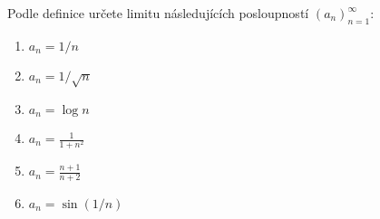 Podle definice určete limitu následujících posloupností $(a_n)_{n = 1}^{\infty}$:
\begin{enumerate}
	\item  $a_n = 1/n$
	\item  $a_n = 1/\sqrt{n}$
	\item  $a_n = \log n$
	\item  $a_n = \frac{1}{1+n^2}$
	\item  $a_n = \frac{n+1}{n+2}$
	\item  $a_n = \sin(1/n)$
\end{enumerate}

